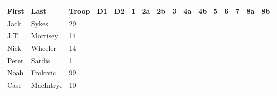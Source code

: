\documentclass{report}
\begin{document}
\vspace{0.5in}
\begin{normalsize}
\begin{tabular}{l|l|l|c|c|c|c|c|c|c|c|c|c|c|c|c}
First & Last & Troop & D1 & D2&1&2a&2b&3&4a&4b&5&6&7&8a&8b\\ 

\hline
Jack & Sykes & 29  & &  &  &  &  &  &  &  &  &  &  &  &  \\ 
 \hline 
J.T. & Morrisey & 14  & &  &  &  &  &  &  &  &  &  &  &  &  \\ 
 \hline 
Nick & Wheeler & 14  & &  &  &  &  &  &  &  &  &  &  &  &  \\ 
 \hline 
Peter & Sardis & 1  & &  &  &  &  &  &  &  &  &  &  &  &  \\ 
 \hline 
Noah & Frokivic & 99  & &  &  &  &  &  &  &  &  &  &  &  &  \\ 
 \hline 
Case & MacIntrye & 10  & &  &  &  &  &  &  &  &  &  &  &  &  \\ 
 \hline 

\end{tabular}
\end{normalsize}
\newpage
\end{document}
